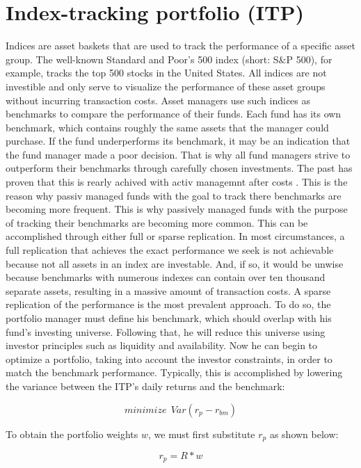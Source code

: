 \documentclass[
  oneside]{book}
\begin{document}
\hypertarget{index-tracking-portfolio-itp}{%
\section{Index-tracking portfolio (ITP)}\label{index-tracking-portfolio-itp}}

Indices are asset baskets that are used to track the performance of a specific asset group. The well-known Standard and Poor's 500 index (short: S\&P 500), for example, tracks the top 500 stocks in the United States. All indices are not investible and only serve to visualize the performance of these asset groups without incurring transaction costs. Asset managers use such indices as benchmarks to compare the performance of their funds. Each fund has its own benchmark, which contains roughly the same assets that the manager could purchase. If the fund underperforms its benchmark, it may be an indication that the fund manager made a poor decision. That is why all fund managers strive to outperform their benchmarks through carefully chosen investments. The past has proven that this is rearly achived with activ managemnt after costs \citep{Desm2016}. This is the reason why passiv managed funds with the goal to track there benchmarks are becoming more frequent. This is why passively managed funds with the purpose of tracking their benchmarks are becoming more common. This can be accomplished through either full or sparse replication. In most circumstances, a full replication that achieves the exact performance we seek is not achievable because not all assets in an index are investable. And, if so, it would be unwise because benchmarks with numerous indexes can contain over ten thousand separate assets, resulting in a massive amount of transaction costs. A sparse replication of the performance is the most prevalent approach. To do so, the portfolio manager must define his benchmark, which should overlap with his fund's investing universe. Following that, he will reduce this universe using investor principles such as liquidity and availability. Now he can begin to optimize a portfolio, taking into account the investor constraints, in order to match the benchmark performance. Typically, this is accomplished by lowering the variance between the ITP's daily returns and the benchmark:

\[
 minimize \ \ Var(r_{p}-r_{bm})
\]

To obtain the portfolio weights \(w\), we must first substitute \(r_{p}\) as shown below:

\[
  r_{p} = R * w
\]
\end{document}
